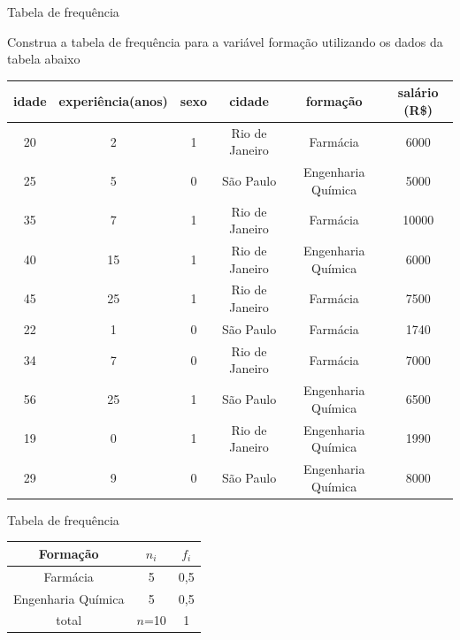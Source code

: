 \begin{frame}{Tabela de frequência}

\begin{exemplo}
    Construa a tabela de frequência para a variável formação utilizando os dados da tabela abaixo
\end{exemplo}


\begin{table}[H]
\centering
\begin{adjustbox}{width=\textwidth}
\begin{tabular}{|c|c|c|c|c|c|}
\hline
idade & experiência(anos) & sexo & cidade         & formação               & salário (R\$) \\ \hline
20    & 2                 & 1    & Rio de Janeiro & Farmácia          & 6000          \\ \hline
25    & 5                 & 0    & São Paulo      & Engenharia Química & 5000          \\ \hline
35    & 7                 & 1    & Rio de Janeiro & Farmácia          & 10000         \\ \hline
40    & 15                & 1    & Rio de Janeiro & Engenharia Química & 6000          \\ \hline
45    & 25                & 1    & Rio de Janeiro & Farmácia          & 7500          \\ \hline
22    & 1                 & 0    & São Paulo      & Farmácia          & 1740          \\ \hline
34    & 7                 & 0    & Rio de Janeiro & Farmácia          & 7000          \\ \hline
56    & 25                & 1    & São Paulo      & Engenharia Química & 6500          \\ \hline
19    & 0                 & 1    & Rio de Janeiro & Engenharia Química & 1990          \\ \hline
29    & 9                 & 0    & São Paulo      & Engenharia Química & 8000          \\ \hline
\end{tabular}
\end{adjustbox}
\end{table}

\end{frame}


\begin{frame}{Tabela de frequência}
\begin{table}[H]
\begin{tabular}{|c|c|c|}
\hline
Formação               & $n_i$  & $f_i$ \\ \hline
Farmácia          & 5      & 0,5   \\ \hline
Engenharia Química & 5      & 0,5   \\ \hline
total                  & $n$=10 & 1     \\ \hline
\end{tabular}
\end{table}
\end{frame}

